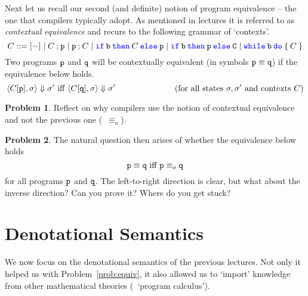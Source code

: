 \documentclass[a4paper, 11pt]{article}
\theoremstyle{definition}
\newtheorem{problem}{Problem}
\newcommand{\blue}[1]{\textcolor{blue}{#1}}
\begin{document}
Next let us recall our second (and definite) notion  of program equivalence --
the one that compilers typically adopt. As mentioned in lectures it is referred
to as \emph{contextual equivalence} and recurs to the following grammar of
`contexts'.
\[              
                C ::= [-] \mid C \> \prog{ \blue{;}} \> \prog{p} 
                \mid 
                \prog{p} \> \prog{ \blue{;}} \> C 
                \mid 
                \mathtt{\blue{ if} \> b \> \blue{ then} \>} C \mathtt{\> \blue{ else} \> p} 
                \mid
                \mathtt{\blue{ if} \> b \> \blue{ then} \>} \prog{p} \mathtt{\> \blue{ else} \> C} 
                \mid
                \mathtt{\blue{ while} \> b \> \blue{ do} \> \{ \>} C \mathtt{\> \}}
\]
Two programs $\mathtt{p}$ and $\mathtt{q}$ will be contextually equivalent (in
symbols $\mathtt{p} \equiv \mathtt{q}$) if the equivalence below holds.
\[
               \langle C[\mathtt{p}], \sigma \rangle \Downarrow \sigma'
               \text{ iff } \langle C[\mathtt{q}], \sigma \rangle \Downarrow \sigma'
               \hspace{2.5cm} (\text{for all states } \sigma,\sigma' \text{ and contexts } C)
\]
\begin{problem}
        Reflect on why compilers use the notion of contextual equivalence and not the
        previous one (\ie\ $\equiv_o$).
\end{problem}
\begin{problem}
        \label{prob:equiv}
        The natural question then arises of whether the equivalence below holds
        \[
                \mathtt{p} \equiv \mathtt{q} \text{ iff } \mathtt{p} \equiv_o \mathtt{q} 
        \]
        for all programs $\mathtt{p}$ and $\mathtt{q}$.  The left-to-right
        direction is clear, but what about the inverse direction?  Can you
        prove it? Where do you get stuck?
\end{problem}

\section{Denotational Semantics}

We now focus on the denotational semantics of the previous lectures.  Not only
it helped us with Problem~\eqref{prob:equiv}, it also allowed us to `import'
knowledge from other mathematical theories (\eg\ `program calculus'). 
\end{document}

